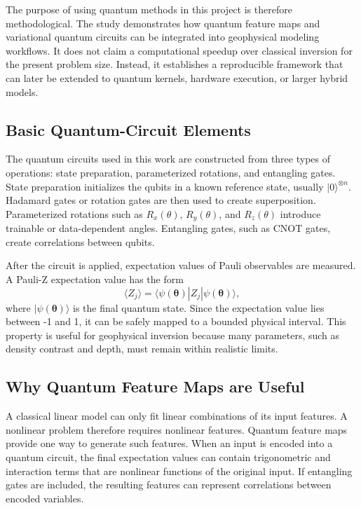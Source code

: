 \documentclass[12pt,a4paper]{article}
\begin{document}
The purpose of using quantum methods in this project is therefore methodological. The study demonstrates how quantum feature maps and variational quantum circuits can be integrated into geophysical modeling workflows. It does not claim a computational speedup over classical inversion for the present problem size. Instead, it establishes a reproducible framework that can later be extended to quantum kernels, hardware execution, or larger hybrid models.

\subsection{Basic Quantum-Circuit Elements}
The quantum circuits used in this work are constructed from three types of operations: state preparation, parameterized rotations, and entangling gates. State preparation initializes the qubits in a known reference state, usually $|0\rangle^{\otimes n}$. Hadamard gates or rotation gates are then used to create superposition. Parameterized rotations such as $R_x(\theta)$, $R_y(\theta)$, and $R_z(\theta)$ introduce trainable or data-dependent angles. Entangling gates, such as CNOT gates, create correlations between qubits.

After the circuit is applied, expectation values of Pauli observables are measured. A Pauli-Z expectation value has the form
\begin{equation}
    \langle Z_j \rangle =
    \langle \psi(\boldsymbol{\theta}) | Z_j | \psi(\boldsymbol{\theta}) \rangle ,
\end{equation}
where $|\psi(\boldsymbol{\theta})\rangle$ is the final quantum state. Since the expectation value lies between -1 and 1, it can be safely mapped to a bounded physical interval. This property is useful for geophysical inversion because many parameters, such as density contrast and depth, must remain within realistic limits.

\subsection{Why Quantum Feature Maps are Useful}
A classical linear model can only fit linear combinations of its input features. A nonlinear problem therefore requires nonlinear features. Quantum feature maps provide one way to generate such features. When an input is encoded into a quantum circuit, the final expectation values can contain trigonometric and interaction terms that are nonlinear functions of the original input. If entangling gates are included, the resulting features can represent correlations between encoded variables.
\end{document}
